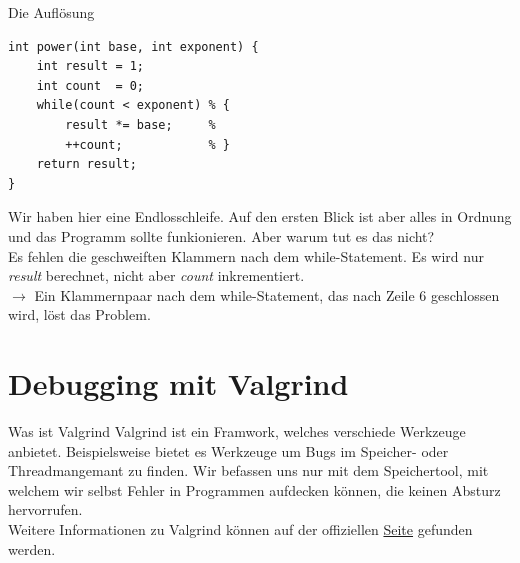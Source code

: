 \begin{frame}[fragile]{Die Auflösung}
\begin{lstlisting}
int power(int base, int exponent) {
	int result = 1;
	int count  = 0;
	while(count < exponent) % {
		result *= base;     %  
		++count;            % }
	return result;
}\end{lstlisting}

Wir haben hier eine Endlosschleife. Auf den ersten Blick ist aber alles in Ordnung und das Programm sollte funkionieren. Aber warum tut es das nicht? \\
Es fehlen die geschweiften Klammern nach dem while-Statement. Es wird nur \textit{result} berechnet, nicht aber \textit{count} inkrementiert.\\
$\rightarrow$  Ein Klammernpaar nach dem while-Statement, das nach Zeile 6 geschlossen wird, l\"ost das Problem.
\end{frame}

\section{Debugging mit Valgrind}
\begin{frame}{Was ist Valgrind}
Valgrind ist ein Framwork, welches verschiede Werkzeuge anbietet. Beispielsweise bietet es Werkzeuge um Bugs im Speicher- oder Threadmangemant zu finden. Wir befassen uns nur mit dem Speichertool, mit welchem wir selbst Fehler in Programmen aufdecken k\"onnen, die keinen Absturz hervorrufen.\\
\bigskip
Weitere Informationen zu Valgrind k\"onnen auf der offiziellen \href{http://valgrind.org/}{Seite} gefunden werden. 
\end{frame}

